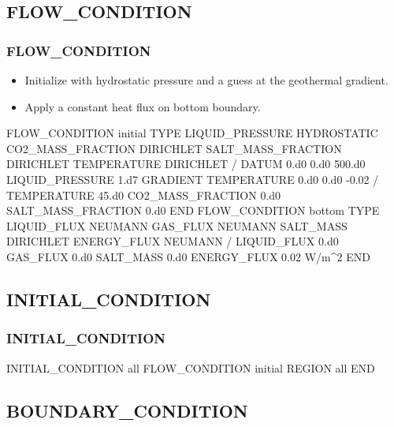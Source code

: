 \documentclass{beamer}
\begin{document}
\subsection{FLOW\_CONDITION}

\begin{frame}\frametitle{FLOW\_CONDITION}

\begin{itemize}
\item Initialize with hydrostatic pressure and a guess at the geothermal gradient.
\item Apply a constant heat flux on bottom boundary.
\end{itemize}

\newpage
\begin{semiverbatim}
FLOW_CONDITION initial
  TYPE
    LIQUID_PRESSURE HYDROSTATIC
    CO2_MASS_FRACTION DIRICHLET
    SALT_MASS_FRACTION DIRICHLET
    TEMPERATURE DIRICHLET
  /
  DATUM 0.d0 0.d0 500.d0
  LIQUID_PRESSURE 1.d7
  GRADIENT
    TEMPERATURE 0.d0 0.d0 -0.02
  /
  TEMPERATURE 45.d0
  CO2_MASS_FRACTION 0.d0
  SALT_MASS_FRACTION 0.d0
END
\newpage
FLOW_CONDITION bottom
  TYPE
    LIQUID_FLUX NEUMANN
    GAS_FLUX NEUMANN
    SALT_MASS DIRICHLET
    ENERGY_FLUX NEUMANN
  /
  LIQUID_FLUX 0.d0
  GAS_FLUX 0.d0
  SALT_MASS 0.d0
  ENERGY_FLUX 0.02 W/m^2
END

\end{semiverbatim}

\end{frame}

\subsection{INITIAL\_CONDITION}

\begin{frame}[fragile]\frametitle{INITIAL\_CONDITION}

\begin{semiverbatim}
INITIAL_CONDITION all
  FLOW_CONDITION initial
  REGION all
END
\end{semiverbatim}

\end{frame}

\subsection{BOUNDARY\_CONDITION}
\end{document}
